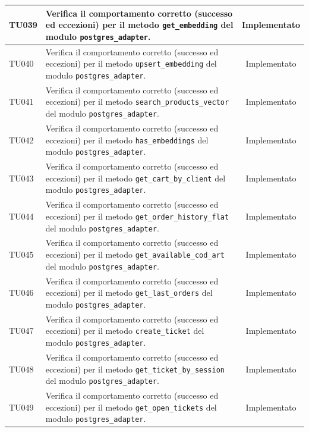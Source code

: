 \documentclass[a4paper,11pt,oneside]{scrartcl}
\begin{document}
\begin{longtable}{|p{1.9cm}|p{11.6cm}|c|}
    TU039           & Verifica il comportamento corretto (successo ed eccezioni) per il metodo \texttt{get\_embedding} del modulo \texttt{postgres\_adapter}.                      & Implementato   \\ \hline
    TU040           & Verifica il comportamento corretto (successo ed eccezioni) per il metodo \texttt{upsert\_embedding} del modulo \texttt{postgres\_adapter}.                   & Implementato   \\ \hline
    TU041           & Verifica il comportamento corretto (successo ed eccezioni) per il metodo \texttt{search\_products\_vector} del modulo \texttt{postgres\_adapter}.            & Implementato   \\ \hline
    TU042           & Verifica il comportamento corretto (successo ed eccezioni) per il metodo \texttt{has\_embeddings} del modulo \texttt{postgres\_adapter}.                     & Implementato   \\ \hline
    TU043           & Verifica il comportamento corretto (successo ed eccezioni) per il metodo \texttt{get\_cart\_by\_client} del modulo \texttt{postgres\_adapter}.               & Implementato   \\ \hline
    TU044           & Verifica il comportamento corretto (successo ed eccezioni) per il metodo \texttt{get\_order\_history\_flat} del modulo \texttt{postgres\_adapter}.           & Implementato   \\ \hline
    TU045           & Verifica il comportamento corretto (successo ed eccezioni) per il metodo \texttt{get\_available\_cod\_art} del modulo \texttt{postgres\_adapter}.            & Implementato   \\ \hline
    TU046           & Verifica il comportamento corretto (successo ed eccezioni) per il metodo \texttt{get\_last\_orders} del modulo \texttt{postgres\_adapter}.                   & Implementato   \\ \hline
    TU047           & Verifica il comportamento corretto (successo ed eccezioni) per il metodo \texttt{create\_ticket} del modulo \texttt{postgres\_adapter}.                      & Implementato   \\ \hline
    TU048           & Verifica il comportamento corretto (successo ed eccezioni) per il metodo \texttt{get\_ticket\_by\_session} del modulo \texttt{postgres\_adapter}.            & Implementato   \\ \hline
    TU049           & Verifica il comportamento corretto (successo ed eccezioni) per il metodo \texttt{get\_open\_tickets} del modulo \texttt{postgres\_adapter}.                  & Implementato   \\ \hline

\end{longtable}
\end{document}
